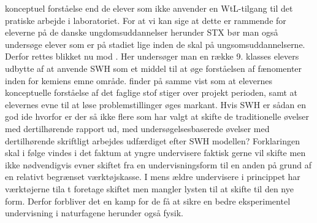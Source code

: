 konceptuel forståelse end de elever som ikke anvender en WtL-tilgang til det pratiske arbejde i laboratoriet. For at vi kan sige at dette er rammende for eleverne på de danske ungdomsuddannelser herunder STX bør man også undersøge elever som er på stadiet lige inden de skal på ungsomsuddannelserne. Derfor rettes blikket nu mod \citep{Kingir2013}. Her undersøger man en række 9. klasses elevers udbytte af at anvende SWH som et middel til at øge forståelsen af fænomenter inden for kemiens emne område. \citet{Kingir2013} finder på samme vist som \citet{Atasoy2013, Erkol2010} at elevernes konceptuelle forståelse af det faglige stof stiger over projekt perioden, samt at elevernes evne til at løse problemstillinger øges markant. Hvis SWH er sådan en god ide hvorfor er der så ikke flere som har valgt at skifte de traditionelle øvelser med dertilhørende rapport ud, med undersøgelsesbaserede øvelser med dertilhørende skriftligt arbejdes udfærdiget efter SWH modellen? Forklaringen skal i følge \citet{Burke2005,Keys1999,Krogh2016} vindes i det faktum at yngre undervisere faktisk gerne vil skifte men ikke nødvendigvis evner skiftet fra en undervisningsform til en anden på grund af en relativt begrænset værktøjskasse. I mens ældre undervisere i princippet har værktøjerne tila t foretage skiftet men mangler lysten til at skifte til den nye form. Derfor forbliver det en kamp for de få at sikre en bedre eksperimentel undervisning i naturfagene herunder også fysik.

